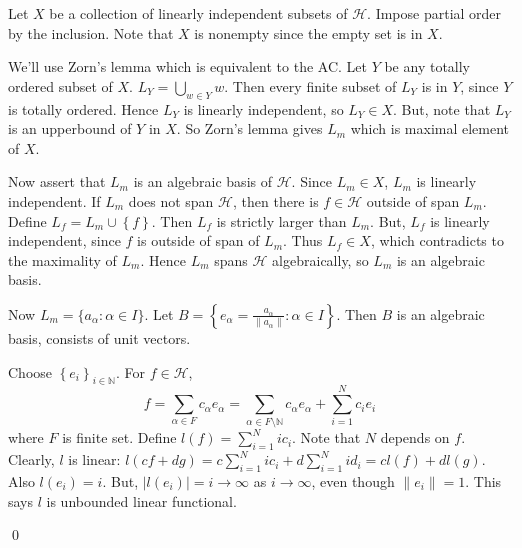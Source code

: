 \begin{problem}[4.1] \hfill
	
	Let $X$ be a collection of linearly independent subsets of $\mathcal{H}$.
	Impose partial order by the inclusion.
	Note that $X$ is nonempty since the empty set is in $X$.

	We'll use Zorn's lemma which is equivalent to the AC.
	Let $Y$ be any totally ordered subset of $X$.
	$L_Y = \bigcup_{w \in Y}w$.
	Then every finite subset of $L_Y$ is in $Y$, since $Y$ is totally ordered.
	Hence $L_Y$ is linearly independent, so $L_Y \in X$.
	But, note that $L_Y$ is an upperbound of $Y$ in $X$.
	So Zorn's lemma gives $L_m$ which is maximal element of $X$.

	Now assert that $L_m$ is an algebraic basis of $\mathcal{H}$.
	Since $L_m \in X$, $L_m$ is linearly independent.
	If $L_m$ does not span $\mathcal{H}$, then there is $f \in \mathcal{H}$ outside of span $L_m$.
	Define $L_f = L_m \cup \left\{ f \right\}$. Then $L_f$ is strictly larger than $L_m$.
	But, $L_f$ is linearly independent, since $f$ is outside of span of $L_m$.
	Thus $L_f \in X$, which contradicts to the maximality of $L_m$.
	Hence $L_m$ spans $\mathcal{H}$ algebraically, so $L_m$ is an algebraic basis.

	Now $L_m = \{a_\alpha: \alpha \in I\}$.
	Let $B = \left\{ e_\alpha = \frac{a_\alpha}{\| a_\alpha \|} : \alpha \in I \right\}$.
	Then $B$ is an algebraic basis, consists of unit vectors.

	Choose $\left\{ e_i \right\}_{i\in \mathbb{N}}$.
	For $f \in \mathcal{H}$,
	\[
		f = \sum_{\alpha \in F} c_\alpha e_\alpha = \sum_{\alpha \in F \setminus \mathbb{N}} c_\alpha e_\alpha + \sum_{i=1}^N c_i e_i
	\]
	where $F$ is finite set.
	Define $l(f) = \sum_{i=1}^N i c_i$.
	Note that $N$ depends on $f$.
	Clearly, $l$ is linear: $l(cf +dg) = c\sum_{i=1}^N i c_i + d\sum_{i=1}^N i d_i = cl(f) + dl(g)$.
	Also $l(e_i) = i$.
	But, $|l(e_i)| = i \rightarrow \infty$ as $i\rightarrow \infty$, even though $\| e_i \| = 1$.
	This says $l$ is unbounded linear functional.

	\qed
\end{problem}
